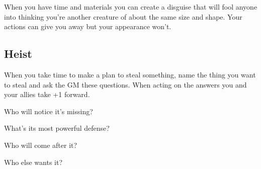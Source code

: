 When you have time and materials you can create a disguise that will fool anyone into thinking you're another creature of about the same size and shape. Your actions can give you away but your appearance won't.

         
\subsection{Heist}   
         

When you take time to make a plan to steal something, name the thing you want to steal and ask the GM these questions. When acting on the answers you and your allies take +1 forward.

         
\startitemize[1,packed]
           
\item Who will notice it's missing?

           
\item What's its most powerful defense?

           
\item Who will come after it?

           
\item Who else wants it?

         
\stopitemize
       

                
